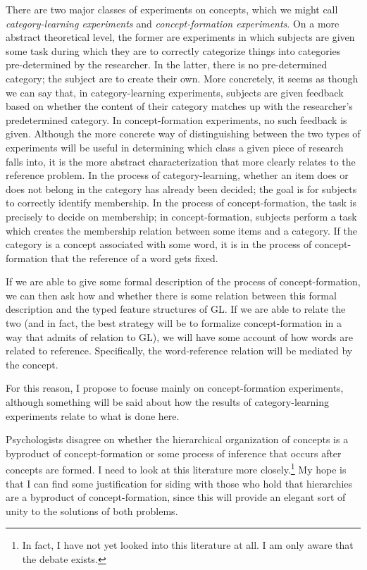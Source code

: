 \documentclass[12pt]{amsart}
\begin{document}
There are two major classes of experiments on concepts, which we might call \emph{category-learning experiments} and \emph{concept-formation experiments}. On a more abstract theoretical level, the former are experiments in which subjects are given some task during which they are to correctly categorize things into categories pre-determined by the researcher. In the latter, there is no pre-determined category; the subject are to create their own. More concretely, it seems as though we can say that, in category-learning experiments, subjects are given feedback based on whether the content of their category matches up with the researcher's predetermined category. In concept-formation experiments, no such feedback is given. Although the more concrete way of distinguishing between the two types of experiments will be useful in determining which class a given piece of research falls into, it is the more abstract characterization that more clearly relates to the reference problem. In the process of category-learning, whether an item does or does not belong in the category has already been decided; the goal is for subjects to correctly identify membership. In the process of concept-formation, the task is precisely to decide on membership; in concept-formation, subjects perform a task which creates the membership relation between some items and a category. If the category is a concept associated with some word, it is in the process of concept-formation that the reference of a word gets fixed.

If we are able to give some formal description of the process of concept-formation, we can then ask how and whether there is some relation between this formal description and the typed feature structures of GL. If we are able to relate the two (and in fact, the best strategy will be to formalize concept-formation in a way that admits of relation to GL), we will have some account of how words are related to reference. Specifically, the word-reference relation will be mediated by the concept.

For this reason, I propose to focuse mainly on concept-formation experiments, although something will be said about how the results of category-learning experiments relate to what is done here.

Psychologists disagree on whether the hierarchical organization of concepts is a byproduct of concept-formation or some process of inference that occurs after concepts are formed. I need to look at this literature more closely.\footnote{In fact, I have not yet looked into this literature at all. I am only aware that the debate exists.} My hope is that I can find some justification for siding with those who hold that hierarchies are a byproduct of concept-formation, since this will provide an elegant sort of unity to the solutions of both problems.
\end{document}
